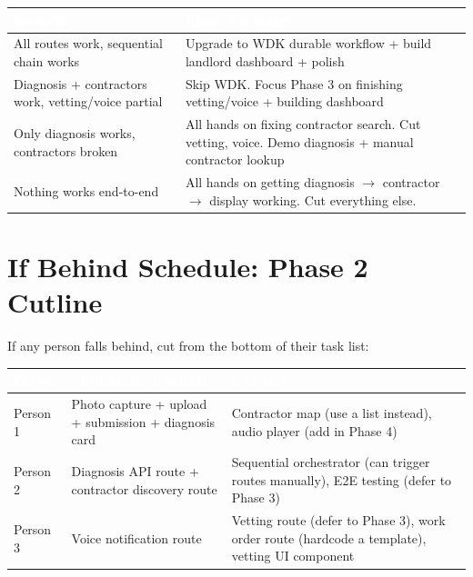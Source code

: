 \documentclass[11pt, a4paper]{article}
\begin{document}
\begin{syncbox}
\begin{tabularx}{\textwidth}{|l|X|}
\hline
\rowcolor{primary}
\textcolor{white}{\textbf{Scenario}} & \textcolor{white}{\textbf{Phase 3 Strategy}} \\
\hline
All routes work, sequential chain works & Upgrade to WDK durable workflow + build landlord dashboard + polish \\
\hline
Diagnosis + contractors work, vetting/voice partial & Skip WDK. Focus Phase 3 on finishing vetting/voice + building dashboard \\
\hline
Only diagnosis works, contractors broken & All hands on fixing contractor search. Cut vetting, voice. Demo diagnosis + manual contractor lookup \\
\hline
Nothing works end-to-end & All hands on getting diagnosis $\rightarrow$ contractor $\rightarrow$ display working. Cut everything else. \\
\hline
\end{tabularx}
\end{syncbox}

\vspace{1em}

\section{If Behind Schedule: Phase 2 Cutline}

If any person falls behind, cut from the bottom of their task list:

\begin{tabularx}{\textwidth}{|l|l|X|}
\hline
\rowcolor{primary}
\textcolor{white}{\textbf{Person}} & \textcolor{white}{\textbf{Must Have (Critical)}} & \textcolor{white}{\textbf{Can Cut}} \\
\hline
Person 1 & Photo capture + upload + submission + diagnosis card & Contractor map (use a list instead), audio player (add in Phase 4) \\
\hline
Person 2 & Diagnosis API route + contractor discovery route & Sequential orchestrator (can trigger routes manually), E2E testing (defer to Phase 3) \\
\hline
Person 3 & Voice notification route & Vetting route (defer to Phase 3), work order route (hardcode a template), vetting UI component \\
\hline
\end{tabularx}

\vspace{0.5em}
\end{document}
